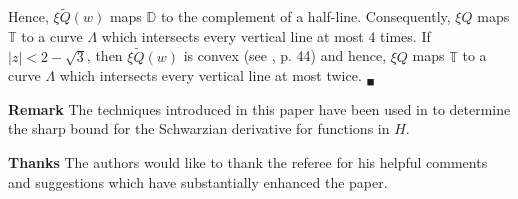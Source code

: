 \documentclass[final]{siamltex}
\newcommand{\T}{\mathbb{T}}
\newcommand{\D}{\mathbb{D}}
\begin{document}
Hence, $\xi \tilde{Q}(w)$ maps $\D$ to the complement of a half-line. Consequently, $\xi Q$ maps $\T$ to a curve $\Lambda$ which intersects every vertical line at most $4$ times.  If $|z| < 2 - \sqrt{3}$, then $\xi \tilde{Q}(w)$ is convex (see \cite{d83}, p. 44) and hence, $\xi Q$ maps $\T$ to a curve $\Lambda$ which intersects every vertical line at most twice. $_\blacksquare$


\vspace{0.1in}

\noindent \textbf{Remark} The techniques introduced in this paper have been used in \cite{bw03} to determine the sharp bound for the Schwarzian derivative for functions in $H$.

\vspace{0.1in} 

\noindent \textbf{Thanks} The authors would like to thank the referee for his helpful comments and suggestions which have substantially enhanced the paper.
\end{document}
